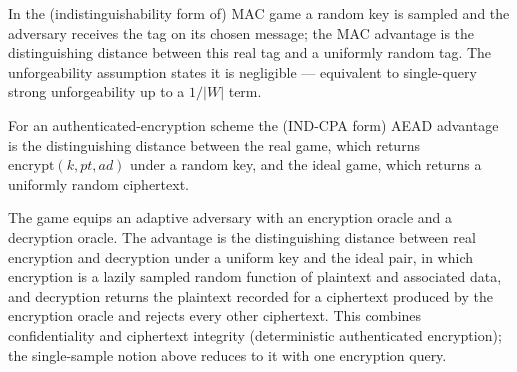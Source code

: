 \begin{definition}
  \label{def:mac}
  \leanok
  In the (indistinguishability form of) MAC game a random key is sampled and the
  adversary receives the tag on its chosen message; the MAC advantage is the
  distinguishing distance between this real tag and a uniformly random tag. The
  unforgeability assumption states it is negligible --- equivalent to
  single-query strong unforgeability up to a $1/|W|$ term.
\end{definition}

\begin{definition}
  \label{def:aead}
  \leanok
  For an authenticated-encryption scheme the (IND-CPA form) AEAD advantage is the
  distinguishing distance between the real game, which returns
  $\mathrm{encrypt}(k, \mathit{pt}, \mathit{ad})$ under a random key, and the
  ideal game, which returns a uniformly random ciphertext.
\end{definition}

\begin{definition}
  \label{def:aead-cca}
  \leanok
  The game equips an adaptive adversary with an encryption oracle and a
  decryption oracle. The advantage is the distinguishing distance between real
  encryption and decryption under a uniform key and the ideal pair, in which
  encryption is a lazily sampled random function of plaintext and associated
  data, and decryption returns the plaintext recorded for a ciphertext produced
  by the encryption oracle and rejects every other ciphertext. This combines
  confidentiality and ciphertext integrity (deterministic authenticated
  encryption); the single-sample notion above reduces to it with one encryption
  query.
\end{definition}
